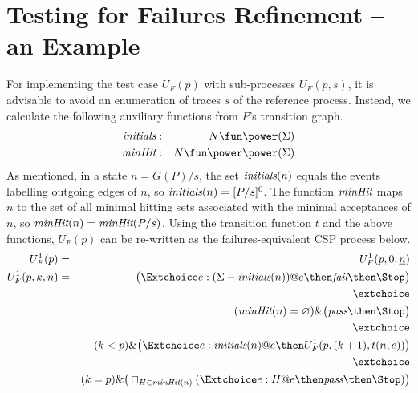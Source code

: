 \section{Testing for Failures Refinement -- an Example}
\label{sec:case}


For implementing the test case $U_F(p)$ with sub-processes $U_F(p,s)$, it is
advisable to avoid an enumeration of traces $s$ of the reference process.
Instead, we calculate the following auxiliary functions from $P$'s transition
graph.
%
\begin{eqnarray*}
\text{\it initials} & : & N \fun \power (\Sigma)
\\
\minhits & : & N \fun \power\power(\Sigma)
\end{eqnarray*}
%
As mentioned, in a state $n = G(P)/s$, the set $\text{\it initials}(n)$
equals the events labelling outgoing edges of $n$, so  $\text{\it
initials}(n) = [P/s]^0$. The function $\text{\it minHit}$ maps $n$ to the set of all
minimal hitting sets associated with the minimal acceptances of $n$, so
$\text{\it minHit}(n) = \text{\it minHit}(P/s)$. Using the transition function $t$ and the
above functions, $U_F(p)$ can be re-written as the failures-equivalent CSP
process below.
%
\begin{eqnarray}
U_F^1(p) & = & U_F^1(p,0,\ii n)
\\
U_F^1(p,k,n) & = & \big(\Extchoice e:(\Sigma - \text{\it initials}(n)) @ e \then \efail\then \Stop \big)
\label{eq:xufa}
\\ & & \extchoice \nonumber
\\ & & (\minhits(n) = \varnothing) \& \big( \epass \then \Stop \big)
\label{eq:xufb}
\\ & & \extchoice \nonumber
\\ & & (k < p) \& \big(\Extchoice e:\text{\it initials}(n) @ e \then U_F^1(p,(k+1),t(n,e)) \big)
\label{eq:xufc}
\\ & & \extchoice \nonumber
\\ & & (k = p) \& \big( \sqcap_{H\in\minhits(n)} (\Extchoice e:H @ e \then \epass \then\Stop ) \big)
\label{eq:xufd}
\end{eqnarray}

